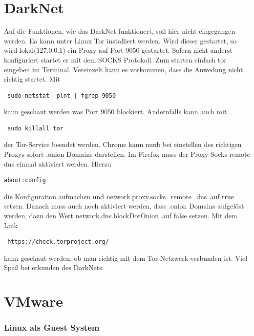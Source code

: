 \documentclass[11pt,fleqn]{book} %
\numberwithin{equation}{section} %
\numberwithin{figure}{section} %
\numberwithin{table}{section} %
\begin{document}
\chapter{DarkNet}
Auf die Funktionen, wie das DarkNet funktionert, soll hier nicht eingegangen werden. Ea kann unter Linux Tor installiert werden. Wird dieser gestartet, so wird lokal(127.0.0.1) ein Proxy auf Port 9050 gestartet. Sofern nicht anderst konfiguriert startet er mit dem SOCKS Protokoll. Zum starten einfach tor eingeben im Terminal. Vereinzelt kann es vorkommen, dass die Anwedung nicht richtig startet. Mit 
\begin{lstlisting}
 sudo netstat -plnt | fgrep 9050
\end{lstlisting}
kann geschaut werden was Port 9050 blockiert. Andernfalls kann auch mit
\begin{lstlisting}
 sudo killall tor
\end{lstlisting}
der Tor-Service beendet werden. Chrome kann nunb bei einstellen des richtigen Proxys sofort .onion Domains darstellen. Im Firefox muss der Proxy Socks remote dns einmal aktiviert werden. Hierzu 
\begin{lstlisting}
about:config                                                                                                                                                                                                                                                                                                                                                                                                     \end{lstlisting}
die Konfiguration aufmachen und \glqq network.proxy.socks\_remote\_dns\grqq \ auf true setzen. Danach muss auch noch aktiviert werden, dass .onion Domains aufgelöst werden, dazu den Wert \glqq network.dns.blockDotOnion\grqq \ auf false setzen. Mit dem Link
\begin{lstlisting}
 https://check.torproject.org/
\end{lstlisting}
kann geschaut werden, ob man richtig mit dem Tor-Netzwerk verbunden ist. Viel Spaß bei erkunden des DarkNets.
\chapter{VMware}
\subsection{Linux als Guest System}
\end{document}
